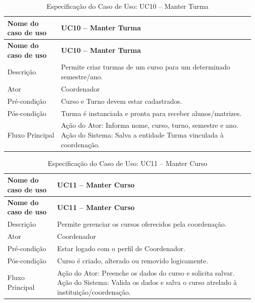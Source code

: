 \fonteautores

\vspace{\baselineskip}

\Needspace{0.48\textheight}
\begin{longtable}{|L{4.5cm}|L{10.5cm}|}
\caption{Especificação do Caso de Uso: UC10 -- Manter Turma} \\
\hline
\textbf{Nome do caso de uso} & \textbf{UC10 -- Manter Turma} \\
\hline
\endfirsthead
\hline
\textbf{Nome do caso de uso} & \textbf{UC10 -- Manter Turma} \\
\hline
\endhead
Descrição       & Permite criar turmas de um curso para um determinado semestre/ano. \\
\hline
Ator            & Coordenador \\
\hline
Pré-condição    & Curso e Turno devem estar cadastrados. \\
\hline
Pós-condição    & Turma é instanciada e pronta para receber alunos/matrizes. \\
\hline
Fluxo Principal & Ação do Ator: Informa nome, curso, turno, semestre e ano. Ação do Sistema: Salva a entidade Turma vinculada à coordenação. \\
\hline
\end{longtable}

\fonteautores

\vspace{\baselineskip}

\Needspace{0.48\textheight}
\begin{longtable}{|L{4.5cm}|L{10.5cm}|}
\caption{Especificação do Caso de Uso: UC11 -- Manter Curso} \\
\hline
\textbf{Nome do caso de uso} & \textbf{UC11 -- Manter Curso} \\
\hline
\endfirsthead
\hline
\textbf{Nome do caso de uso} & \textbf{UC11 -- Manter Curso} \\
\hline
\endhead
Descrição       & Permite gerenciar os cursos oferecidos pela coordenação. \\
\hline
Ator            & Coordenador \\
\hline
Pré-condição    & Estar logado com o perfil de Coordenador. \\
\hline
Pós-condição    & Curso é criado, alterado ou removido logicamente. \\
\hline
Fluxo Principal & Ação do Ator: Preenche os dados do curso e solicita salvar. Ação do Sistema: Valida os dados e salva o curso atrelado à instituição/coordenação. \\
\hline
\end{longtable}

